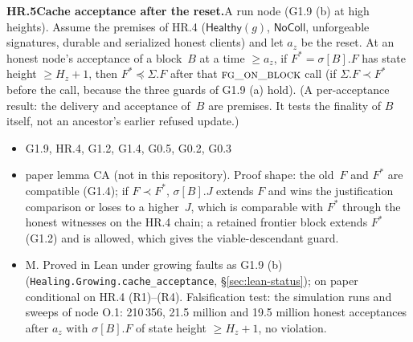 \documentclass{article}
\newcommand{\fname}[1]{\text{\textsc{#1}}}
\newcommand{\dagnode}[6]{%
\par\medskip\noindent\textbf{#1\enspace #2.}\enspace #3
\begin{itemize}[leftmargin=2.2em,itemsep=0pt,topsep=2pt]
\item[\emph{Uses}] #4
\item[\emph{Evid.}] #5
\item[\emph{Task}] #6
\end{itemize}}
\begin{document}
\dagnode{HR.5}{Cache acceptance after the reset}{A run node (G1.9 (b) at
high heights).  Assume the premises of HR.4 ($\mathsf{Healthy}(g)$,
$\mathsf{NoColl}$, unforgeable signatures, durable and serialized honest
clients) and let $a_z$ be the reset.  At an honest node's acceptance of a block~$B$
at a time $\geq a_z$, if $F^*=\sigma[B].F$ has state height $\geq H_z+1$, then
$F^*\preceq\Sigma.F$ after that $\fname{fg\_on\_block}$ call (if $\Sigma.F\prec F^*$
before the call, because the three guards of G1.9 (a) hold).  (A per-acceptance result: the delivery and acceptance
of~$B$ are premises.  It tests the finality of $B$ itself, not an ancestor's
earlier refused update.)}
{G1.9, HR.4, G1.2, G1.4, G0.5, G0.2, G0.3}
{paper lemma CA (not in this repository).  Proof shape:
the old~$F$ and $F^*$ are compatible (G1.4); if $F\prec F^*$, $\sigma[B].J$
extends $F$ and wins the justification comparison or loses to a higher~$J$,
which is comparable with $F^*$ through the honest witnesses on the HR.4 chain;
a retained frontier block extends $F^*$ (G1.2) and is allowed, which gives the
viable-descendant guard.}
{M.  Proved in Lean under growing faults as G1.9 (b)
(\texttt{Healing.Growing.cache\_acceptance}, \S\ref{sec:lean-status}); on paper conditional on HR.4 (R1)--(R4).  Falsification test: the
simulation runs and sweeps of node O.1: 210\,356, 21.5 million and
19.5 million honest acceptances after $a_z$ with $\sigma[B].F$ of state height $\geq H_z+1$,
no violation.}
\end{document}
